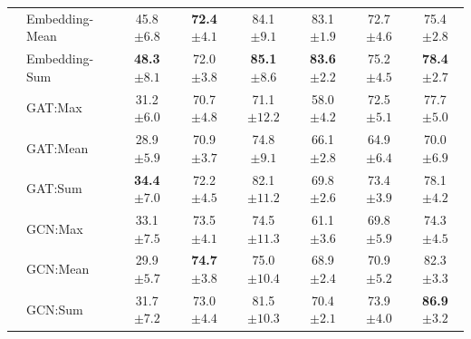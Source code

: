 \begin{table}[!b]
{\begin{tabular}{@{}c <{\enspace}@{}lcccccc@{}}
			& \textsf{Embedding-Mean}     & 45.8 \scriptsize $\pm 6.8$	 & \textbf{72.4}     \scriptsize $\pm 4.1 $         & 84.1 \scriptsize $\pm 9.1$	       & 83.1   \scriptsize $\pm 1.9$         & 72.7 \scriptsize $\pm 4.6$	 & 75.4 \scriptsize $\pm 2.8$
			\\ 
			& \textsf{Embedding-Sum} & \textbf{48.3} \scriptsize	$\pm 8.1$          & 72.0  \scriptsize $\pm 3.8$             & \textbf{85.1} \scriptsize $\pm 8.6$	     & \textbf{83.6}   \scriptsize $\pm 2.2$         & 75.2  \scriptsize $\pm 4.5$ & \textbf{78.4} \scriptsize $\pm 2.7$    
			\\ 
			\cmidrule{2-8}
			\multirow{10}{*}{\rotatebox{90}{Graph Neural Networks}} 
			& \textsf{GAT:Max}                    & 31.2 \scriptsize $\pm 6.0$        & 70.7 \scriptsize $\pm 4.8$          & 71.1 \scriptsize $\pm 12.2$ & 58.0 \scriptsize $\pm 4.2$          & 72.5 \scriptsize $\pm 5.1$         & 77.7 \scriptsize $\pm 5.0$ 
			\\ 
			& \textsf{GAT:Mean}    & 28.9 \scriptsize $\pm 5.9$          & 70.9 \scriptsize $\pm 3.7$           & 74.8 \scriptsize $\pm 9.1$            & 66.1 \scriptsize $\pm 2.8$         & 64.9 \scriptsize $\pm 6.4$  & 70.0 \scriptsize $\pm 6.9$
			\\ 
			& \textsf{GAT:Sum}                  & \textbf{34.4} \scriptsize $\pm 7.0$          & 72.2 \scriptsize $\pm 4.5$	            & 82.1 \scriptsize $\pm 11.2$            & 69.8 \scriptsize $\pm 2.6$	          & 73.4 \scriptsize $\pm 3.9$ & 78.1 \scriptsize $\pm 4.2$        
			\\
			\cmidrule{2-8}
			& \textsf{GCN:Max} & 33.1 \scriptsize $\pm 7.5$ &	73.5 \scriptsize $\pm 4.1$	& 74.5 \scriptsize $\pm 11.3$ & 61.1 \scriptsize $\pm 3.6$ &	69.8 \scriptsize $\pm 5.9$ & 74.3 \scriptsize $\pm 4.5$
			\\ 
			& \textsf{GCN:Mean} & 29.9 \scriptsize $\pm 5.7$ &	\textbf{74.7} \scriptsize $\pm 3.8$ & 75.0 \scriptsize $\pm 10.4$ &	68.9 \scriptsize $\pm 2.4$ &	70.9 \scriptsize $\pm 5.2$ & 82.3 \scriptsize $\pm 3.3$
			\\ 
			& \textsf{GCN:Sum} & 31.7 \scriptsize $\pm 7.2$ &	73.0 \scriptsize $\pm 4.4$	& 81.5 \scriptsize $\pm 10.3$ & 70.4 \scriptsize $\pm 2.1$ & 73.9 \scriptsize $\pm 4.0$	& \textbf{86.9} \scriptsize $\pm 3.2$                       
			\\
			\cmidrule{2-8}	
						

\end{tabular}}
\end{table}
